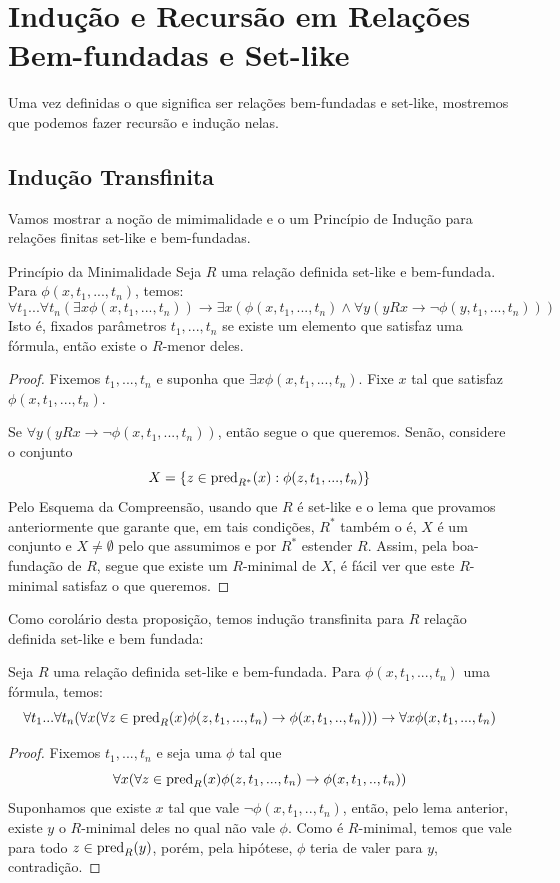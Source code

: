 \section{Indução e Recursão em Relações Bem-fundadas e Set-like}
Uma vez definidas o que significa ser relações bem-fundadas e set-like, mostremos que podemos fazer recursão e indução nelas. 

\subsection{Indução Transfinita}

Vamos mostrar a noção de mimimalidade e o um Princípio de Indução para relações finitas set-like e bem-fundadas. 

\begin{proposition}{Princípio da Minimalidade}
    Seja $R$ uma relação definida set-like e bem-fundada. Para $\phi(x,t_1,...,t_n)$, temos:
    $$
    \forall t_1...\forall t_n(\exists x\phi(x,t_1,...,t_n)) \to \exists x(\phi(x,t_1,...,t_n)\land \forall y(yRx \to \neg\phi(y,t_1,...,t_n)))
    $$
    Isto é, fixados parâmetros $t_1,...,t_n$ se existe um elemento que satisfaz uma fórmula, então existe o $R$-menor deles.
\end{proposition}
\begin{proof}
    Fixemos $t_1,...,t_n$ e suponha que $\exists x\phi(x,t_1,...,t_n)$. Fixe $x$ tal que satisfaz $\phi(x,t_1,...,t_n)$. 

    Se $\forall y(yRx \to \neg\phi(x,t_1,...,t_n))$, então segue o que queremos. Senão, considere o conjunto
    $$
    X = \left\{ z\in \operatorname{pred}_{R^*}(x):\phi(z,t_1,...,t_n) \right\}
    $$
    Pelo Esquema da Compreensão, usando que $R$ é set-like e o lema que provamos anteriormente que garante que, em tais condições, $R^*$ também o é, $X$ é um conjunto e $X\neq \emptyset$ pelo que assumimos e por $R^*$ estender $R$. Assim, pela boa-fundação de $R$, segue que existe um $R$-minimal de $X$, é fácil ver que este $R$-minimal satisfaz o que queremos.
\end{proof}

Como corolário desta proposição, temos indução transfinita para $R$ relação definida set-like e bem fundada:

\begin{corollary}
    Seja $R$ uma relação definida set-like e bem-fundada. Para $\phi(x,t_1,...,t_n)$ uma fórmula, temos:
    $$\forall t_1...\forall t_n(\forall x(\forall z\in \operatorname{pred}_R(x)\phi(z,t_1,...,t_n)\to \phi(x,t_1,..,t_n)))\to\forall x\phi(x,t_1,...,t_n)$$
\end{corollary}
\begin{proof}
    Fixemos $t_1,...,t_n$ e seja uma $\phi$ tal que 
    $$
    \forall x(\forall z\in \operatorname{pred}_R(x)\phi(z,t_1,...,t_n)\to \phi(x,t_1,..,t_n))$$
    Suponhamos que existe $x$ tal que vale $\neg\phi(x,t_1,..,t_n)$, então, pelo lema anterior, existe $y$ o $R$-minimal deles no qual não vale $\phi$. Como é $R$-minimal, temos que vale para todo $z\in \operatorname{pred}_R(y)$, porém, pela hipótese, $\phi$ teria de valer para $y$, contradição. 
\end{proof}

